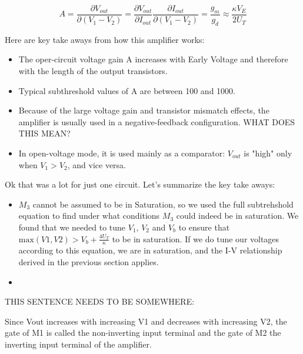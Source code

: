 \begin{equation}
    A = \frac{\partial{V_{out}}}{\partial{(V_1 - V_2)}} = \frac{\partial {V_{out}}}{\partial{I_{out}}} \frac{\partial {I_{out}}}{\partial{(V_1 - V_2)}} = \frac{g_m}{g_d} \approx \frac{\kappa V_E}{2U_T}
\end{equation}

Here are key take aways from how this amplifier works: 

\begin{itemize}
    \item The oper-circuit voltage gain A increases with Early Voltage and therefore with the length of the output transistors.
    \item Typical subthreshold values of A are between 100 and 1000.
    \item Because of the large voltage gain and transistor mismatch effects, the amplifier is usually used in a negative-feedback configuration. WHAT DOES THIS MEAN?
    \item In open-voltage mode, it is used mainly as a comparator: $V_{out}$ is "high" only when $V_1 > V_2$, and vice versa. 
\end{itemize}


Ok that was a lot for just one circuit. Let's summarize the key take aways: 

\begin{itemize}
    \item $M_3$ cannot be assumed to be in Saturation, so we used the full subtrehshold equation to find under what conditions $M_3$ could indeed be in saturation. We found that we needed to tune $V_1$, $V_2$ and $V_b$ to ensure that $\textrm{max}(V1,V2) > V_b + \frac{4U_T}{\kappa}$ to be in saturation. If we do tune our voltages according to this equation, we are in saturation, and the I-V relationship derived in the previous section applies. 
    \item 
\end{itemize}

THIS SENTENCE NEEDS TO BE SOMEWHERE:

Since Vout increases with increasing V1 and decreases with increasing V2,
the gate of M1 is called the non-inverting input terminal and the gate of
M2 the inverting input terminal of the amplifier.